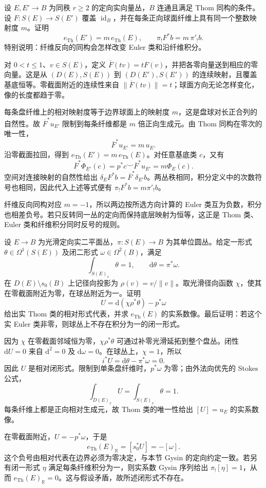 \begin{exercise}\label{g2:ex:gysin-fiber-degree}
	设 \(E,E'\to B\) 为同秩 \(r\ge2\) 的定向实向量丛，\(B\) 连通且满足 Thom 同构的条件。设 \(F:S(E)\to S(E')\) 覆盖 \(\operatorname{id}_B\)，并在每条正向球面纤维上具有同一个整数映射度 \(m\)。证明
	\[
		e_{\mathrm{Th}}(E')=m\,e_{\mathrm{Th}}(E),\qquad
		\pi_!F^*b=m\,\pi'_!b.
	\]
	特别说明：纤维反向的同构会怎样改变 Euler 类和沿纤维积分。
\end{exercise}
\begin{solution}
	对 \(0<t\le1\)、\(v\in S(E)\)，定义 \(\overline F(tv)=tF(v)\)，并把各零向量送到相应的零向量。这是从 \((D(E),S(E))\) 到 \((D(E'),S(E'))\) 的连续映射，且覆盖基底恒等。零截面附近的连续性来自 \(\|\overline F(tv)\|=t\)；球面方向无论怎样变化，像的长度都趋于零。

	每条盘纤维上的相对映射度等于边界球面上的映射度 \(m\)，这是盘球对长正合列的自然性。故 \(\overline F^*u_{E'}\) 限制到每条纤维都是 \(m\) 倍正向生成元。由 Thom 同构在零次的唯一性，
	\[
		\overline F^*u_{E'}=m\,u_E.
	\]
	沿零截面拉回，得到 \(e_{\mathrm{Th}}(E')=m\,e_{\mathrm{Th}}(E)\)。对任意基底类 \(c\)，又有
	\[
		\overline F^*\Phi_{E'}(c)=p^*c\smile\overline F^*u_{E'}=m\Phi_E(c).
	\]
	空间对连接映射的自然性给出 \(\delta_EF^*b=\overline F^*\delta_{E'}b\)。两丛秩相同，积分定义中的次数符号也相同，因此代入上述等式便有 \(\pi_!F^*b=m\pi'_!b\)。

	纤维反向同构对应 \(m=-1\)，所以两边按所选方向计算的 Euler 类互为负数，积分也相差负号。若只反转同一丛的定向而保持底层映射为恒等，这正是 Thom 类、Euler 类和纤维积分同时反号的规则。
\end{solution}

\begin{exercise}\label{g2:ex:angular-form-thom}
	设 \(E\to B\) 为光滑定向实二平面丛，\(\pi:S(E)\to B\) 为其单位圆丛。给定一形式 \(\theta\in\Omega^1(S(E))\) 及闭二形式 \(\omega\in\Omega^2(B)\)，满足
	\[
		\int_{S(E)_x}\theta=1,\qquad \mathrm d\theta=\pi^*\omega.
	\]
	在 \(D(E)\setminus s_0(B)\) 上记径向投影为 \(\rho(v)=v/\|v\|\)。取光滑径向函数 \(\chi\)，使其在零截面附近为零，在球丛附近为一。证明
	\[
		U=\mathrm d(\chi\rho^*\theta)-p^*\omega
	\]
	给出实 Thom 类的相对形式代表，并求 \(e_{\mathrm{Th}}(E)\) 的实系数像。最后证明：若这个实 Euler 类非零，则球丛上不存在积分为一的闭一形式。
\end{exercise}
\begin{solution}
	因为 \(\chi\) 在零截面邻域恒为零，\(\chi\rho^*\theta\) 可通过补零光滑延拓到整个盘丛。闭性 \(\mathrm dU=0\) 来自 \(\mathrm d^2=0\) 及 \(\mathrm d\omega=0\)。在球丛上，\(\chi=1\)，所以
	\[
		i^*U=\mathrm d\theta-\pi^*\omega=0.
	\]
	因此 \(U\) 是相对闭形式。限制到单条盘纤维时，\(p^*\omega\) 为零；由外法向优先的 Stokes 公式，
	\[
		\int_{D(E)_x}U=\int_{S(E)_x}\theta=1.
	\]
	每条纤维上都是正向相对生成元，故 Thom 类的唯一性给出 \([U]=u_E\) 的实系数像。

	在零截面附近，\(U=-p^*\omega\)，于是
	\[
		e_{\mathrm{Th}}(E)_{\mathbb R}=[s_0^*U]=-[\omega].
	\]
	这个负号由相对代表在边界必须为零决定，与本节 Gysin 的定向约定一致。若另有闭一形式 \(\eta\) 满足每条纤维积分为一，则实系数 Gysin 序列给出 \(\pi_![\eta]=1\)，从而 \(e_{\mathrm{Th}}(E)_{\mathbb R}=0\)。这与假设矛盾，故所述闭形式不存在。
\end{solution}
